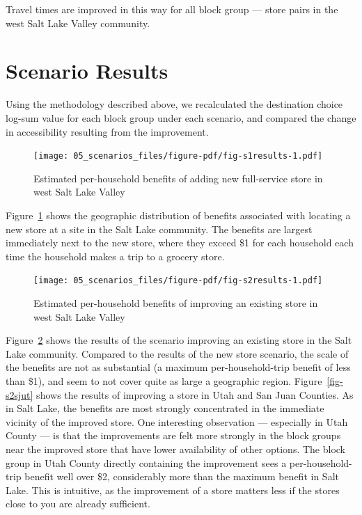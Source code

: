 \documentclass[
  letterpaper,
  DIV=11,
  numbers=noendperiod]{scrreport}
\begin{document}
Travel times are improved in this way for all block group --- store
pairs in the west Salt Lake Valley community.

\hypertarget{scenario-results}{%
\section{Scenario Results}\label{scenario-results}}

Using the methodology described above, we recalculated the destination
choice log-sum value for each block group under each scenario, and
compared the change in accessibility resulting from the improvement.

\begin{figure}[t]

{\centering \texttt{[image: 05\_scenarios\_files/figure-pdf/fig-s1results-1.pdf]}

}

\caption{\label{fig-s1results}Estimated per-household benefits of adding
new full-service store in west Salt Lake Valley}

\end{figure}

Figure~\ref{fig-s1results} shows the geographic distribution of benefits
associated with locating a new store at a site in the Salt Lake
community. The benefits are largest immediately next to the new store,
where they exceed \$1 for each household each time the household makes a
trip to a grocery store.

\begin{figure}[t]

{\centering \texttt{[image: 05\_scenarios\_files/figure-pdf/fig-s2results-1.pdf]}

}

\caption{\label{fig-s2results}Estimated per-household benefits of
improving an existing store in west Salt Lake Valley}

\end{figure}

Figure~\ref{fig-s2results} shows the results of the scenario improving
an existing store in the Salt Lake community. Compared to the results of
the new store scenario, the scale of the benefits are not as substantial
(a maximum per-household-trip benefit of less than \$1), and seem to not
cover quite as large a geographic region. Figure~\ref{fig-s2sjut} shows
the results of improving a store in Utah and San Juan Counties. As in
Salt Lake, the benefits are most strongly concentrated in the immediate
vicinity of the improved store. One interesting observation ---
especially in Utah County --- is that the improvements are felt more
strongly in the block groups near the improved store that have lower
availability of other options. The block group in Utah County directly
containing the improvement sees a per-household-trip benefit well over
\$2, considerably more than the maximum benefit in Salt Lake. This is
intuitive, as the improvement of a store matters less if the stores
close to you are already sufficient.
\end{document}
